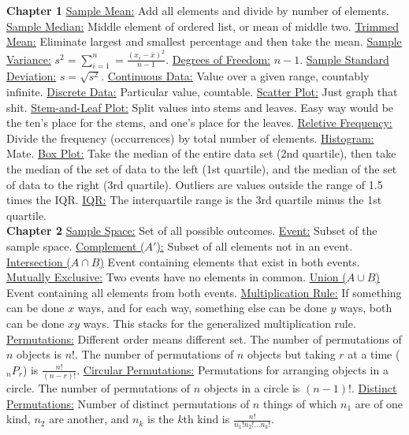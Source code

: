 \documentclass[9pt]{article}
\newcommand*\mean[1]{\bar{#1}}
\begin{document}
    \noindent\textbf{Chapter 1}
        \underline{Sample Mean:} Add all elements and divide by number of elements. 
        \underline{Sample Median:} Middle element of ordered list, or mean of middle two.
        \underline{Trimmed Mean:} Eliminate largest and smallest percentage and then take the mean.
        \underline{Sample Variance:} $s^2 = \sum_{i=1}^{n}=\frac{(x_i-\mean{x})^2}{n-1}$.
        \underline{Degrees of Freedom:} $n-1$.
        \underline{Sample Standard Deviation:} $s = \sqrt{s^2}$.
        \underline{Continuous Data:} Value over a given range, countably infinite.
        \underline{Discrete Data:} Particular value, countable.
        \underline{Scatter Plot:} Just graph that shit.
        \underline{Stem-and-Leaf Plot:} Split values into stems and leaves. Easy way would be the ten's place for the stems, and one's place for the leaves.
        \underline{Reletive Frequency:} Divide the frequency (occurrences) by total number of elements.
        \underline{Histogram:} Mate.
        \underline{Box Plot:} Take the median of the entire data set (2nd quartile), then take the median of the set of data to the left (1st quartile), and the median of the set of data to the right (3rd quartile). Outliers are values outside the range of 1.5 times the IQR.
        \underline{IQR:} The interquartile range is the 3rd quartile minus the 1st quartile.
    \\
    \noindent\textbf{Chapter 2}
        \underline{Sample Space:} Set of all possible outcomes.
        \underline{Event:} Subset of the sample space.
        \underline{Complement ($A'$):} Subset of all elements not in an event.
        \underline{Intersection ($A\cap B$)} Event containing elements that exist in both events.
        \underline{Mutually Exclusive:} Two events have no elements in common.
        \underline{Union ($A\cup B$)} Event containing all elements from both events.
        \underline{Multiplication Rule:} If something can be done $x$ ways, and for each way, something else can be done $y$ ways, both can be done $xy$ ways. This stacks for the generalized multiplication rule.
        \underline{Permutations:} Different order means different set. The number of permutations of $n$ objects is $n!$. The number of permutations of $n$ objects but taking $r$ at a time ($_nP_r$) is $\frac{n!}{(n-r)!}$.
        \underline{Circular Permutations:} Permutations for arranging objects in a circle. The number of permutations of $n$ objects in a circle is $(n-1)!$. 
        \underline{Distinct Permutations:} Number of distinct permutations of $n$ things of which $n_1$ are of one kind, $n_2$ are another, and $n_k$ is the $k$th kind is $\frac{n!}{n_1!n_2!...n_k!}$.
\end{document}
